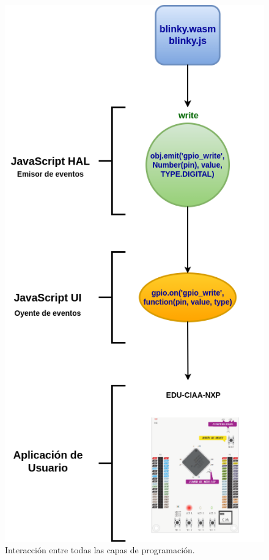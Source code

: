 \begin{figure}[ht]
	\centering
	\includegraphics[scale=.36]{./Figures/AplicacionUsuarioLeds.png}
	\caption{Interacción entre todas las capas de programación.}
	\label{fig:AplicacionUsuarioLeds}
\end{figure}


